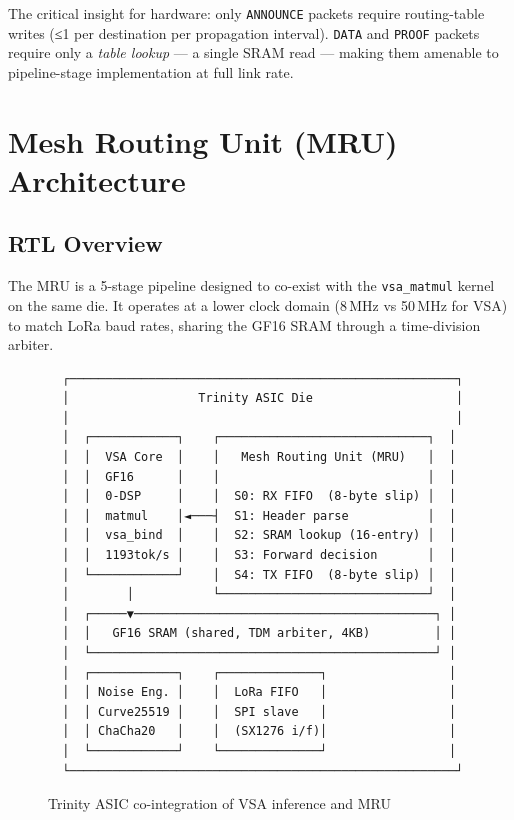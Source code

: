 The critical insight for hardware: only \texttt{ANNOUNCE} packets
require routing-table writes (≤1 per destination per propagation
interval).  \texttt{DATA} and \texttt{PROOF} packets require only a
\emph{table lookup} — a single SRAM read — making them amenable to
pipeline-stage implementation at full link rate.

\section{Mesh Routing Unit (MRU) Architecture}

\subsection{RTL Overview}

The MRU is a 5-stage pipeline designed to co-exist with the
\texttt{vsa\_matmul} kernel on the same die.
It operates at a lower clock domain (8\,MHz vs 50\,MHz for VSA)
to match LoRa baud rates, sharing the GF16 SRAM through a
time-division arbiter.

\begin{figure}[h]
\centering
\begin{verbatim}
  ┌──────────────────────────────────────────────────────┐
  │                  Trinity ASIC Die                    │
  │                                                      │
  │  ┌────────────┐    ┌─────────────────────────────┐  │
  │  │  VSA Core  │    │   Mesh Routing Unit (MRU)   │  │
  │  │  GF16      │    │                             │  │
  │  │  0-DSP     │    │  S0: RX FIFO  (8-byte slip) │  │
  │  │  matmul    │◄───┤  S1: Header parse           │  │
  │  │  vsa_bind  │    │  S2: SRAM lookup (16-entry) │  │
  │  │  1193tok/s │    │  S3: Forward decision       │  │
  │  └────────────┘    │  S4: TX FIFO  (8-byte slip) │  │
  │        │           └─────────────────────────────┘  │
  │  ┌─────▼──────────────────────────────────────────┐ │
  │  │   GF16 SRAM (shared, TDM arbiter, 4KB)         │ │
  │  └────────────────────────────────────────────────┘ │
  │  ┌────────────┐    ┌──────────────┐                 │
  │  │ Noise Eng. │    │  LoRa FIFO   │                 │
  │  │ Curve25519 │    │  SPI slave   │                 │
  │  │ ChaCha20   │    │  (SX1276 i/f)│                 │
  │  └────────────┘    └──────────────┘                 │
  └──────────────────────────────────────────────────────┘
\end{verbatim}
\caption{Trinity ASIC co-integration of VSA inference and MRU}
\label{fig:asic-block}
\end{figure}


